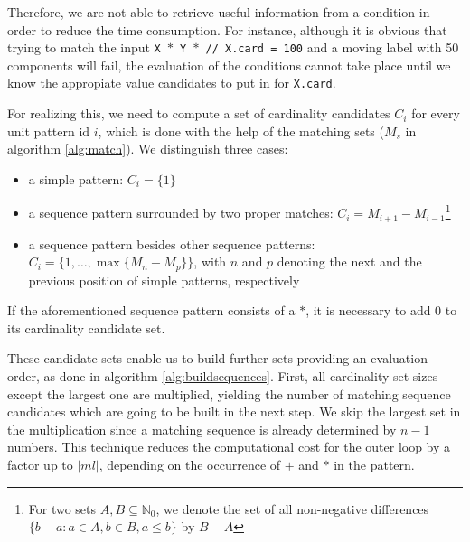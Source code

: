\documentclass{sig-alternate}
\begin{document}
Therefore, we are not able to retrieve useful information from a condition in order to reduce the time consumption. For instance, although it is obvious that trying to match the input \texttt{X $\ast$ Y $\ast$ // X.card = 100} and a moving label with 50 components will fail, the evaluation of the conditions cannot take place until we know the appropiate value candidates to put in for \texttt{X.card}.

For realizing this, we need to compute a set of cardinality candidates $C_i$ for every unit pattern id $i$, which is done with the help of the matching sets ($M_s$ in algorithm \ref{alg:match}). We distinguish three cases:
\begin{itemize}
  \item a simple pattern: $C_i=\{1\}$
  \item a sequence pattern surrounded by two proper matches: $C_i=M_{i+1}-M_{i-1}$\footnote{For two sets $A, B\subseteq \mathbb{N}_0$, we denote the set of all non-negative differences $\{b-a\colon a\in A, b\in B, a\leq b\}$ by $B-A$}
  \item a sequence pattern besides other sequence patterns: $C_{i}=\{1,\dots,\max\{M_{n}-M_{p}\}\}$, with $n$ and $p$ denoting the next and the previous position of simple patterns, respectively
\end{itemize}

If the aforementioned sequence pattern consists of a $\ast$, it is necessary to add $0$ to its cardinality candidate set.

These candidate sets enable us to build further sets providing an evaluation order, as done in algorithm \ref{alg:buildsequences}. First, all cardinality set sizes except the largest one are multiplied, yielding the number of matching sequence candidates which are going to be built in the next step. We skip the largest set in the multiplication since a matching sequence is already determined by $n-1$ numbers. This technique reduces the computational cost for the outer loop by a factor up to $\left|ml\right|$, depending on the occurrence of $+$ and $\ast$ in the pattern.
\end{document}
